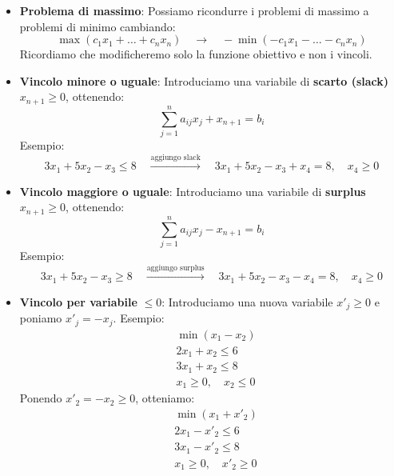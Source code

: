 \begin{itemize}
    \item \textbf{Problema di massimo}:  
    Possiamo ricondurre i problemi di massimo a problemi di minimo cambiando:
    \[
    \max(c_1x_1 + \ldots + c_nx_n) 
    \quad \longrightarrow \quad 
    -\min(-c_1x_1 - \ldots - c_nx_n)
    \]
    Ricordiamo che modificheremo solo la funzione obiettivo e non i vincoli.
    
    \item \textbf{Vincolo minore o uguale}:  
    Introduciamo una variabile di \textbf{scarto (slack)} \( x_{n+1} \ge 0 \), ottenendo:
    \[
    \sum_{j=1}^n a_{ij}x_j + x_{n+1} = b_i
    \]
    Esempio:
    \[
    3x_1 + 5x_2 - x_3 \le 8 
    \quad \xrightarrow{\text{aggiungo slack}} \quad
    3x_1 + 5x_2 - x_3 + x_4 = 8, \quad x_4 \ge 0
    \]

    \item \textbf{Vincolo maggiore o uguale}:  
    Introduciamo una variabile di \textbf{surplus} \( x_{n+1} \ge 0 \), ottenendo:
    \[
    \sum_{j=1}^n a_{ij}x_j - x_{n+1} = b_i
    \]
    Esempio:
    \[
    3x_1 + 5x_2 - x_3 \ge 8 
    \quad \xrightarrow{\text{aggiungo surplus}} \quad
    3x_1 + 5x_2 - x_3 - x_4 = 8, \quad x_4 \ge 0
    \]

    \item \textbf{Vincolo per variabile} \( \le 0 \):  
    Introduciamo una nuova variabile \( x'_j \ge 0 \) e poniamo \( x'_j = -x_j \).  
    Esempio:
    \[
    \begin{aligned}
    &\min(x_1 - x_2) \\
    &2x_1 + x_2 \le 6 \\
    &3x_1 + x_2 \le 8 \\
    &x_1 \ge 0, \quad x_2 \le 0
    \end{aligned}
    \]
    Ponendo \( x'_2 = -x_2 \ge 0 \), otteniamo:
    \[
    \begin{aligned}
    &\min(x_1 + x'_2) \\
    &2x_1 - x'_2 \le 6 \\
    &3x_1 - x'_2 \le 8 \\
    &x_1 \ge 0, \quad x'_2 \ge 0
    \end{aligned}
    \]


\end{itemize}
